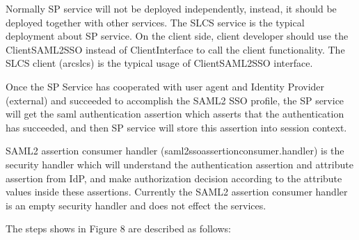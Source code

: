 \documentclass{article}                            %
\begin{document}
   Normally SP service will not be deployed independently, instead, it should be deployed together with other services. The SLCS service is the typical deployment about SP service. On the client side, client developer should use the ClientSAML2SSO instead of ClientInterface to call the client functionality. The SLCS client (arcslcs) is the typical usage of  ClientSAML2SSO interface.

    Once the SP Service has cooperated with user agent and Identity Provider (external) and succeeded to accomplish the SAML2 SSO profile,  the SP service will get the saml authentication assertion which asserts that the authentication has succeeded, and then SP service will store this assertion into session context.

    SAML2 assertion consumer handler (saml2ssoassertionconsumer.handler) is the security handler which will understand the authentication assertion and attribute assertion from IdP, and make authorization decision according to the attribute values inside these assertions. Currently the SAML2 assertion consumer handler is an empty security handler and does not effect the services.


The steps shows in Figure 8 are described as follows:
\end{document}
